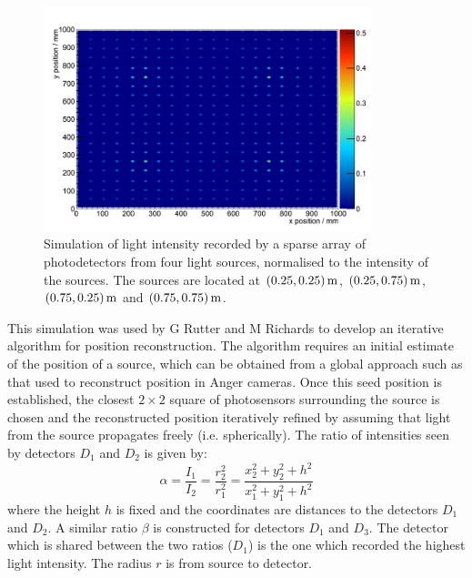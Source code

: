 \begin{figure}
\centering
\includegraphics[width=0.85\textwidth]{chapters/detectorphysics_images/four-sources}
\caption[Simulation of light intensity recorded by a sparse array of photodetectors]{\label{fig:flux-example}Simulation of light intensity recorded by a sparse array of photodetectors from four light sources, normalised to the intensity of the sources. The sources are located at $(0.25, 0.25) \metre$, $(0.25, 0.75) \metre$, $(0.75, 0.25)\metre$ and $(0.75, 0.75) \metre$.} 
\end{figure}

This simulation was used by G Rutter and M Richards to develop an iterative algorithm for position reconstruction\citep{Rutter2011}. The algorithm requires an initial estimate of the position of a source, which can be obtained from a global approach such as that used to reconstruct position in Anger cameras\citep{Anger1958}. Once this seed position is established, the closest $2\times 2$ square of photosensors surrounding the source is chosen and the reconstructed position iteratively refined by assuming that light from the source propagates freely (i.e. spherically). The ratio of intensities seen by detectors $D_1$ and $D_2$ is given by\citep{Rutter2011}:
\begin{equation}\label{eqn:ratio-detector-intensities}
\alpha = \frac{I_1}{I_2} = \frac{r_2^2}{r_1^2} = \frac{x_2^2 + y_2^2 + h^2}{x_1^2 + y_1^2 + h^2} 
\end{equation}
where the height $h$ is fixed and the coordinates are distances to the detectors $D_1$ and $D_2$. A similar ratio $\beta$ is constructed for detectors $D_1$ and $D_3$. The detector which is shared between the two ratios ($D_1$) is the one which recorded the highest light intensity. The radius $r$ is from source to detector.

